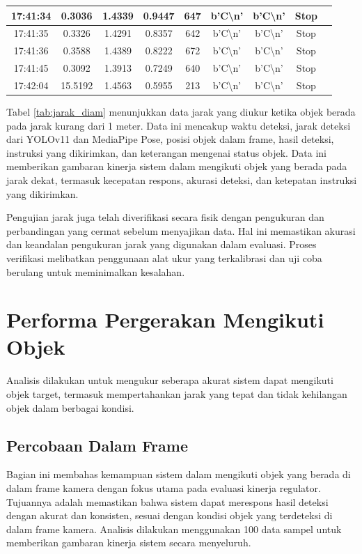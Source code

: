 \begin{table}[H]
\begin{tabular}{|c|c|c|c|c|c|c|c|c|}
    17:41:34 & 0.3036 & 1.4339 & 0.9447 & 647 & b'C\textbackslash n' & b'C\textbackslash n' & Stop \\ \hline
    17:41:35 & 0.3326 & 1.4291 & 0.8357 & 642 & b'C\textbackslash n' & b'C\textbackslash n' & Stop \\ \hline
    17:41:36 & 0.3588 & 1.4389 & 0.8222 & 672 & b'C\textbackslash n' & b'C\textbackslash n' & Stop \\ \hline
    17:41:45 & 0.3092 & 1.3913 & 0.7249 & 640 & b'C\textbackslash n' & b'C\textbackslash n' & Stop \\ \hline
    17:42:04 & 15.5192 & 1.4563 & 0.5955 & 213 & b'C\textbackslash n' & b'C\textbackslash n' & Stop \\ \hline
    \end{tabular}
    \end{table}

Tabel \ref{tab:jarak_diam} menunjukkan data jarak yang diukur ketika objek berada pada jarak kurang dari 1 meter. Data ini mencakup waktu deteksi, jarak deteksi dari YOLOv11 dan MediaPipe Pose, posisi objek dalam frame, hasil deteksi, instruksi yang dikirimkan, dan keterangan mengenai status objek. Data ini memberikan gambaran kinerja sistem dalam mengikuti objek yang berada pada jarak dekat, termasuk kecepatan respons, akurasi deteksi, dan ketepatan instruksi yang dikirimkan.

Pengujian jarak juga telah diverifikasi secara fisik dengan pengukuran dan perbandingan yang cermat sebelum menyajikan data. Hal ini memastikan akurasi dan keandalan pengukuran jarak yang digunakan dalam evaluasi. Proses verifikasi melibatkan penggunaan alat ukur yang terkalibrasi dan uji coba berulang untuk meminimalkan kesalahan.

\newpage
\section{Performa Pergerakan Mengikuti Objek}
\label{sec:performaakurasiobjek}

Analisis dilakukan untuk mengukur seberapa akurat sistem dapat mengikuti objek target, termasuk mempertahankan jarak yang tepat dan tidak kehilangan objek dalam berbagai kondisi.

\subsection{Percobaan Dalam Frame}
\label{subsec:percobaandalamframe}

Bagian ini membahas kemampuan sistem dalam mengikuti objek yang berada di dalam frame kamera dengan fokus utama pada evaluasi kinerja regulator. Tujuannya adalah memastikan bahwa sistem dapat merespons hasil deteksi dengan akurat dan konsisten, sesuai dengan kondisi objek yang terdeteksi di dalam frame kamera. Analisis dilakukan menggunakan 100 data sampel untuk memberikan gambaran kinerja sistem secara menyeluruh.

